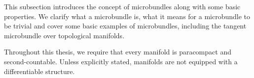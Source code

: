 \begin{myparagraph} This subsection introduces the concept of microbundles along with some basic properties. We clarify what a microbundle is, what it means for a microbundle to be trivial and cover some basic examples of microbundles, including the tangent microbundle over topological manifolds.

Throughout this thesis, we require that every manifold is paracompact and second-countable. Unless explicitly stated, manifolds are not equipped with a differentiable structure. \end{myparagraph}         